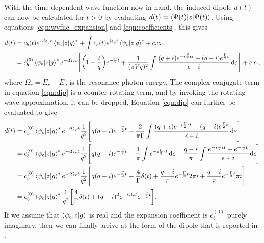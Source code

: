 With the time dependent wave function now in hand, the induced dipole $d(t)$ can now be calculated for $t>0$ by evaluating  $d(t)=\braket{\Psi(t)|z|\Psi(t)}$.  Using equations \ref{eqn:wvfnc_expansion} and \ref{eqn:coefficients}, this gives
\begin{equation}
\label{eqn:dip}
	\begin{aligned}
		d(t)&=c_b(t)e^{-i\varepsilon_g t}\braket{\psi_b|z|g}^* + \int c_\varepsilon(t)e^{i\varepsilon_g t}\braket{\psi_\varepsilon|z|g}^* + c.c.\\
		&=c_b^{(0)}\braket{\psi_b|z|g}^*e^{-i\Omega_r t}\Bigg[\bigg(1-\frac{i}{q}\bigg)e^{-\frac{\Gamma}{2}t}+ \frac{1}{(\pi V q)^2}\int \frac{(q+\epsilon)e^{-i\frac{\Gamma}{2}\epsilon t}-(q-i)e^{\frac{\Gamma}{2}t}}{\epsilon+i}\mathop{}\!\mathrm{d}\varepsilon\Bigg] + c.c.,
	\end{aligned}
\end{equation}
where $\Omega_r=E_r-E_g$ is the resonance photon energy.  The complex conjugate term in equation \ref{eqn:dip} is a counter-rotating term, and by invoking the rotating wave approximation, it can be dropped.  Equation \ref{eqn:dip} can further be evaluated to give
\begin{equation}
	\begin{aligned}
	d(t) &= c_b^{(0)}\braket{\psi_b|z|g}^*e^{-i\Omega_r t}\frac{1}{q^2}\Bigg[q(q-i)e^{-\frac{\Gamma}{2}t}+\frac{2}{\pi\Gamma}\int \frac{(q+\epsilon)e^{-i\frac{\Gamma}{2}\epsilon t}-(q-i)e^{\frac{\Gamma}{2}t}}{\epsilon+i}\mathop{}\!\mathrm{d}\varepsilon\Bigg]\\
	&= c_b^{(0)}\braket{\psi_b|z|g}^*e^{-i\Omega_r t}\frac{1}{q^2}\Bigg[q(q-i)e^{-\frac{\Gamma}{2}t} + \frac{1}{\pi} \int e^{-i\frac{\Gamma}{2}\epsilon t}\mathop{}\!\mathrm{d}\epsilon + \frac{q-i}{\pi}\int \frac{e^{-i\frac{\Gamma}{2}\epsilon t} - e^{-\frac{\Gamma}{2}t}}{\epsilon+i} \mathop{}\!\mathrm{d}\epsilon\Bigg]\\
	&=c_b^{(0)}\braket{\psi_b|z|g}^*e^{-i\Omega_r t}\frac{1}{q^2} \Bigg[ q(q-i)e^{-\frac{\Gamma}{2}t}+ \frac{4}{\Gamma}\delta(t) + \frac{q-i}{\pi}e^{-\frac{\Gamma}{2}t}2\pi i + \frac{q-i}{\pi}e^{-\frac{\Gamma}{2}t}\pi i \Bigg]\\
	&=c_b^{(0)}\braket{\psi_b|z|g}^*\frac{1}{q^2}\bigg[ \frac{4}{\Gamma}\delta(t)+(q-i)^2e^{-i\Omega_r t}e^{-\frac{\Gamma}{2}t}\bigg].
	\end{aligned}
\end{equation}
If we assume that $\braket{\psi_b|z|g}$ is real and the expansion coefficient is $c_b^{(0)}$ purely imaginary, then we can finally arrive at the form of the dipole that is reported in \cite{chuTheoryUltrafastAutoionization2010,ottLorentzMeetsFano2013,kaldunFanoResonancesTime2014},
